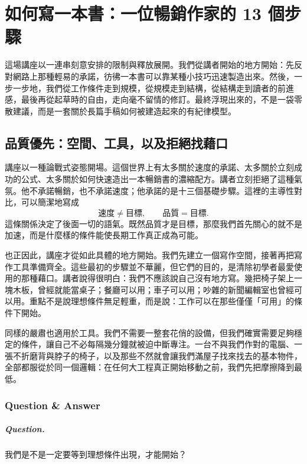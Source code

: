 \chapter{如何寫一本書：一位暢銷作家的 13 個步驟}

這場講座以一連串刻意安排的限制與釋放展開。我們從講者開始的地方開始：先反對網路上那種輕易的承諾，彷彿一本書可以靠某種小技巧迅速製造出來。然後，一步一步地，我們從工作條件走到規模，從規模走到結構，從結構走到讀者的前進感，最後再從起草時的自由，走向毫不留情的修訂。最終浮現出來的，不是一袋零散建議，而是一套關於長篇手稿如何被建造起來的有紀律模型。

\section{品質優先：空間、工具，以及拒絕找藉口}

講座以一種論戰式姿態開場。這個世界上有太多關於速度的承諾、太多關於立刻成功的公式、太多關於如何快速造出一本暢銷書的濃縮配方。講者立刻拒絕了這種氣氛。他不承諾暢銷，也不承諾速度；他承諾的是十三個基礎步驟。這裡的主導性對比，可以簡潔地寫成
\begin{equation}
\text{速度} \neq \text{目標}, \qquad \text{品質} = \text{目標}.
\end{equation}
這條關係決定了後面一切的語氣。既然品質才是目標，那麼我們首先關心的就不是加速，而是什麼樣的條件能使長期工作真正成為可能。

也正因此，講座才從如此具體的地方開始。我們先建立一個寫作空間，接著再把寫作工具準備齊全。這些最初的步驟並不華麗，但它們的目的，是清除初學者最愛使用的那種藉口。講者說得很明白：我們不應該說自己沒有地方寫。幾把椅子架上一塊木板，曾經就能當桌子；餐廳可以用；車子可以用；吵雜的新聞編輯室也曾經可以用。重點不是說理想條件無足輕重，而是說：工作可以在那些僅僅「可用」的條件下開始。

同樣的嚴肅也適用於工具。我們不需要一整套花俏的設備，但我們確實需要足夠穩定的條件，讓自己不必每隔幾分鐘就被迫中斷專注。一台不與我們作對的電腦、一張不折磨背與脖子的椅子，以及那些不然就會讓我們滿屋子找來找去的基本物件，全部都服從於同一個邏輯：在任何大工程真正開始移動之前，我們先把摩擦降到最低。

\subsection{Question \& Answer}

\paragraph{Question.} 我們是不是一定要等到理想條件出現，才能開始？

